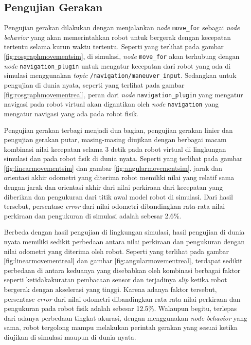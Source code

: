 \subsection{Pengujian Gerakan}
\label{subsec:movementtesting}




Pengujian gerakan dilakukan dengan menjalankan \emph{node} \lstinline{move_for} sebagai \emph{node behavior} yang akan memerintahkan robot untuk bergerak dengan kecepatan tertentu selama kurun waktu tertentu.
Seperti yang terlihat pada gambar \ref{fig:rosgraphmovementsim},
  di simulasi,
  \emph{node} \lstinline{move_for} akan terhubung dengan \emph{node} \lstinline{navigation_plugin} untuk mengatur kecepatan dari robot yang ada di simulasi menggunakan \emph{topic} \lstinline{/navigation/maneuver_input}.
Sedangkan untuk pengujian di dunia nyata,
  seperti yang terlihat pada gambar \ref{fig:rosgraphmovementreal},
  peran dari \emph{node} \lstinline{navigation_plugin} yang mengatur navigasi pada robot virtual akan digantikan oleh \emph{node} \lstinline{navigation} yang mengatur navigasi yang ada pada robot fisik.




Pengujian gerakan terbagi menjadi dua bagian,
  pengujian gerakan linier dan pengujian gerakan putar,
  masing-masing diujikan dengan berbagai macam kombinasi nilai kecepatan selama 3 detik pada robot virtual di lingkungan simulasi dan pada robot fisik di dunia nyata.
Seperti yang terlihat pada gambar \ref{fig:linearmovementsim} dan gambar \ref{fig:angularmovementsim},
  jarak dan orientasi akhir odometri yang diterima robot memiliki nilai yang relatif sama dengan jarak dan orientasi akhir dari nilai perkiraan dari kecepatan yang diberikan dan pengukuran dari titik awal model robot di simulasi.
Dari hasil tersebut,
  persentase \emph{error} dari nilai odometri dibandingkan rata-rata nilai perkiraan dan pengukuran di simulasi adalah sebesar 2.6\%.




Berbeda dengan hasil pengujian di lingkungan simulasi,
  hasil pengujian di dunia nyata memiliki sedikit perbedaan antara nilai perkiraan dan pengukuran dengan nilai odometri yang diterima oleh robot.
Seperti yang terlihat pada gambar \ref{fig:linearmovementreal} dan gambar \ref{fig:angularmovementreal},
  terdapat sedikit perbedaan di antara keduanya yang disebabkan oleh kombinasi berbagai faktor seperti ketidakakuratan pembacaan sensor dan terjadinya \emph{slip} ketika robot bergerak dengan akselerasi yang tinggi.
Karena adanya faktor tersebut,
  persentase \emph{error} dari nilai odometri dibandingkan rata-rata nilai perkiraan dan pengukuran pada robot fisik adalah sebesar 12.5\%.
Walaupun begitu,
  terlepas dari adanya perbedaan tingkat akurasi,
  dengan menggunakan \emph{node behavior} yang sama,
  robot tergolong mampu melakukan perintah gerakan yang sesuai ketika diujikan di simulasi maupun di dunia nyata.
